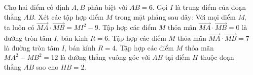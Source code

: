 \begin{ex}%
	Cho hai điểm cố định $A, B$ phân biệt với $AB=6$. Gọi $I$ là trung điểm của đoạn thẳng $AB$. Xét các tập hợp điểm $M$ trong mặt phẳng sau đây:
	\choiceTF
	{\True Với mọi điểm $M$, ta luôn có $\overrightarrow{MA}\cdot\overrightarrow{MB}=MI^2-9$.}
	{Tập hợp các điểm $M$ thỏa mãn $\overrightarrow{MA}\cdot\overrightarrow{MB}=0$ là đường tròn tâm $I$, bán kính $R=6$.}
	{\True Tập hợp các điểm $M$ thỏa mãn $\overrightarrow{MA}\cdot\overrightarrow{MB}=7$ là đường tròn tâm $I$, bán kính $R=4$.}
	{\True Tập hợp các điểm $M$ thỏa mãn $MA^2-MB^2=12$ là đường thẳng vuông góc với $AB$ tại điểm $H$ thuộc đoạn thẳng $AB$ sao cho $HB=2$.}
\end{ex}

